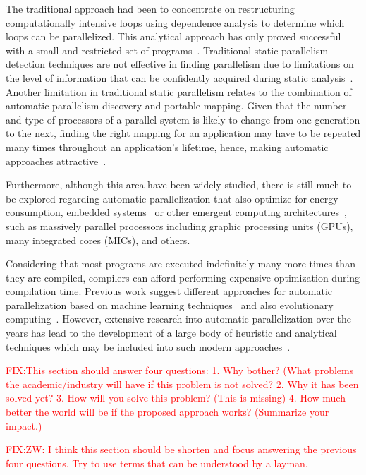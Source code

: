 \documentclass[a4paper,12pt]{article}
\newcommand\FIXME[1]{\textcolor{red}{FIX:}\textcolor{red}{#1}}
\begin{document}
The traditional approach had been to concentrate on restructuring
computationally intensive loops using dependence analysis to determine which
loops can be parallelized.  This analytical approach has only proved successful
with a small and restricted-set of programs~\cite{williams99}. Traditional
static parallelism detection techniques are not effective in finding
parallelism due to limitations on the level of information that can be
confidently acquired during static analysis~\cite{tournavitis09,wang14a}.
Another limitation in traditional static parallelism relates to the combination
of automatic parallelism discovery and portable mapping.  Given that the number
and type of processors of a parallel system is likely to change from one
generation to the next, finding the right mapping for an application may have
to be repeated many times throughout an application’s lifetime, hence, making
automatic approaches attractive~\cite{tournavitis09,wang14a}.

Furthermore, although this area have been widely studied, there is still much
to be explored regarding automatic parallelization that also optimize for
energy consumption, embedded systems~\cite{cordes10} or other emergent
computing architectures~\cite{baskaran10}, such as massively parallel
processors including graphic processing units (GPUs), many integrated cores
(MICs), and others.

Considering that most programs are executed indefinitely many more times than
they are compiled, compilers can afford performing expensive optimization
during compilation time.  Previous work suggest different approaches for
automatic parallelization based on machine learning
techniques~\cite{tournavitis09,wang14a} and also evolutionary
computing~\cite{walsh95,walsh96,williams96,williams99}.  However, extensive
research into automatic parallelization over the years has lead to the
development of a large body of heuristic and analytical techniques which may be
included into such modern approaches~\cite{williams99}.

\FIXME{This section should answer four questions:
1. Why bother?  (What problems the academic/industry will have if 
this problem is not solved?
2. Why it has been solved yet?
3. How will you solve this problem? (This is missing)
4. How much better the world will be if the proposed approach works? (Summarize your impact.)
}

\FIXME{ZW: I think this section should be shorten and focus answering the previous
four questions. Try to use terms that can be understood by a layman.}
\end{document}
